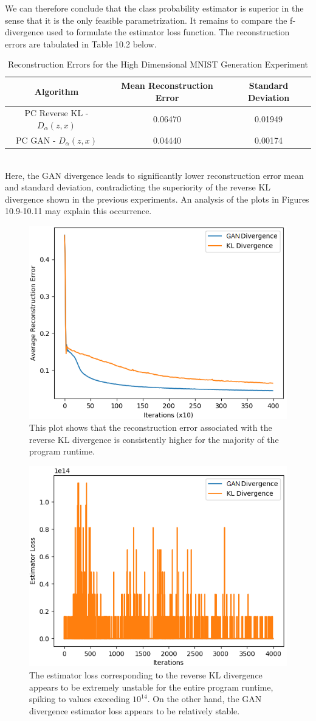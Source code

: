 \documentclass[honours,12pt]{unswthesis}
\numberwithin{equation}{section}
\theoremstyle{definition}
\begin{document}
We can therefore conclude that the class probability estimator is superior in the sense that it is the only feasible parametrization. It remains to compare the f-divergence used to formulate the estimator loss function. The reconstruction errors are tabulated in Table 10.2 below.
\begin{table}[h]
\centering
\begin{tabular}{|c|c|c|}
\hline
Algorithm & Mean Reconstruction Error & Standard Deviation\\
\hline
PC Reverse KL - $D_\alpha(z,x)$ & 0.06470 & 0.01949\\
\hline
PC GAN - $D_\alpha(z,x)$ & 0.04440 & 0.00174\\
\hline
\end{tabular}
\caption{Reconstruction Errors for the High Dimensional MNIST Generation Experiment}
\end{table}\\
Here, the GAN divergence leads to significantly lower reconstruction error mean and standard deviation, contradicting the superiority of the reverse KL divergence shown in the previous experiments. An analysis of the plots in Figures 10.9-10.11 may explain this occurrence.
\begin{figure}[h]
\centering
\includegraphics[width=0.49\linewidth]{part4reconerrors/PCADVvsPCKLD.png}
\caption{\small This plot shows that the reconstruction error associated with the reverse KL divergence is consistently higher for the majority of the program runtime.}
\end{figure}
\begin{figure}[h]
\centering
\includegraphics[width=0.49\linewidth]{part4estimatorlosses/PCADVvsPCKLD.png}
\caption{\small The estimator loss corresponding to the reverse KL divergence appears to be extremely unstable for the entire program runtime, spiking to values exceeding $10^{14}$. On the other hand, the GAN divergence estimator loss appears to be relatively stable.}
\end{figure}
\end{document}
